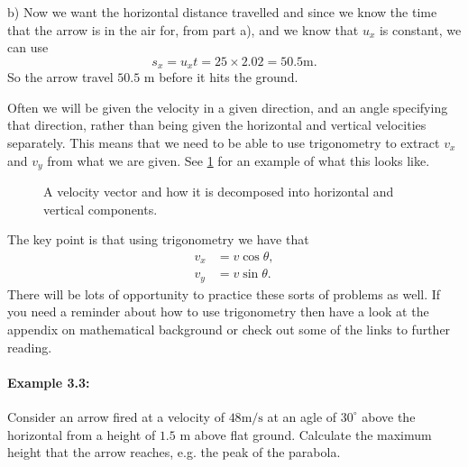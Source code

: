 b) Now we want the horizontal distance travelled and since we know the time that the arrow is in the air for, from part a), and we know that $u_{x}$ is constant, we can use 
\begin{equation*}
s_{x}=u_{x}t=25\times 2.02=50.5\text{m}.
\end{equation*}
So the arrow travel $50.5$ m before it hits the ground.

Often we will be given the velocity in a given direction, and an angle specifying that direction, rather than being given the horizontal and vertical velocities separately. This means that we need to be able to use trigonometry to extract $v_{x}$ and $v_{y}$ from what we are given. See \cref{fig: velocity components} for an example of what this looks like. 
\begin{figure}[ht]
    \centering
    \caption{A velocity vector and how it is decomposed into horizontal and vertical components.}
    \label{fig: velocity components}
\end{figure}

The key point is that using trigonometry we have that
\begin{align*}
v_{x}&=v\cos\theta,\\
v_{y}&=v\sin\theta.
\end{align*}
There will be lots of opportunity to practice these sorts of problems as well. If you need a reminder about how to use trigonometry then have a look at the appendix on mathematical background or check out some of the links to further reading.

\paragraph{Example 3.3:} Consider an arrow fired at a velocity of $48\text{m/s}$ at an agle of $30^{\circ}$ above the horizontal from a height of $1.5$ m above flat ground. Calculate the maximum height that the arrow reaches, e.g. the peak of the parabola.\\

